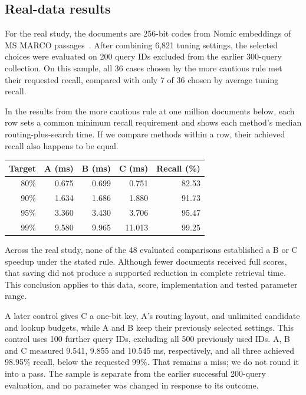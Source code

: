 \subsection{Real-data results}
For the real study, the documents are 256-bit codes from Nomic embeddings of MS MARCO passages~\cite{nomic,msmarco}.
After combining 6,821 tuning settings, the selected choices were evaluated on 200 query IDs
excluded from the earlier 300-query collection. On this sample, all 36 cases chosen by the more cautious
rule met their requested recall, compared with only 7 of 36 chosen by average tuning recall.

In the results from the more cautious rule at one million documents below, each row sets a common minimum
recall requirement and shows each method's median routing-plus-search time. If we compare
methods within a row, their achieved recall also happens to be equal.

\begin{center}
\begin{tabular}{@{}rrrrr@{}}
\toprule
Target & A (ms) & B (ms) & C (ms) & Recall (\%)\\
\midrule
80\% & 0.675 & 0.699 & 0.751 & 82.53\\
90\% & 1.634 & 1.686 & 1.880 & 91.73\\
95\% & 3.360 & 3.430 & 3.706 & 95.47\\
99\% & 9.580 & 9.965 & 11.013 & 99.25\\
\bottomrule
\end{tabular}
\end{center}


Across the real study, none of the 48 evaluated comparisons established a B or C speedup
under the stated rule. Although fewer documents received full scores, that saving did not
produce a supported reduction in complete retrieval time. This conclusion applies to this
data, score, implementation and tested parameter range.

A later control gives C a one-bit key, A's routing layout, and unlimited candidate and lookup
budgets, while A and B keep their previously selected settings. This control uses 100 further query IDs,
excluding all 500 previously used IDs. A, B and C measured 9.541, 9.855 and 10.545 ms,
respectively, and all three achieved 98.95\% recall, below the requested 99\%. That remains
a miss; we do not round it into a pass. The sample is separate from the earlier successful
200-query evaluation, and no parameter was changed in response to its outcome.

